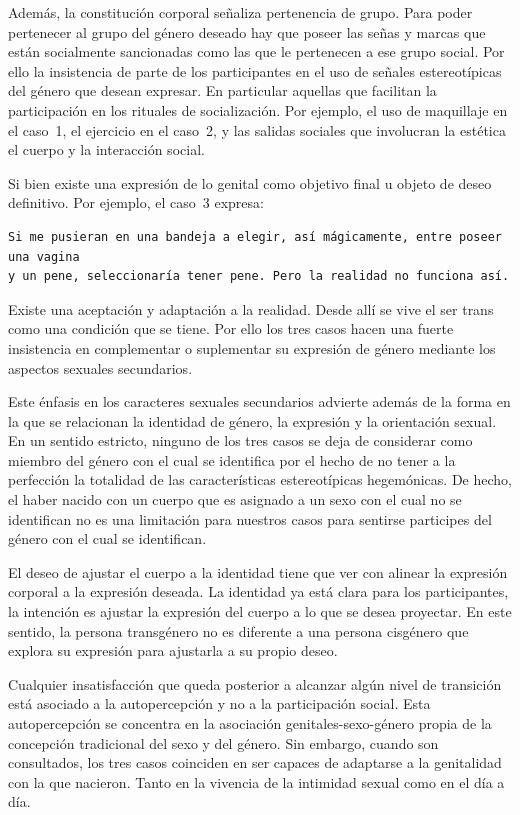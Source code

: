 Además, la constitución corporal señaliza pertenencia de grupo. Para poder
pertenecer al grupo del género deseado hay que poseer las señas y marcas que
están socialmente sancionadas como las que le pertenecen a ese grupo social. Por
ello la insistencia de parte de los participantes en el uso de señales
estereotípicas del género que desean expresar. En particular aquellas que
facilitan la participación en los rituales de socialización. Por ejemplo, el uso
de maquillaje en el caso~1, el ejercicio en el caso~2, y las salidas sociales
que involucran la estética el cuerpo y la interacción social.

Si bien existe una expresión de lo genital como objetivo final u objeto de deseo
definitivo. Por ejemplo, el caso~3 expresa:

\begin{verbatim}
Si me pusieran en una bandeja a elegir, así mágicamente, entre poseer una vagina
y un pene, seleccionaría tener pene. Pero la realidad no funciona así.
\end{verbatim}

Existe una aceptación y adaptación a la realidad. Desde allí se vive el ser
trans como una condición que se tiene. Por ello los tres casos hacen una fuerte
insistencia en complementar o suplementar su expresión de género mediante los
aspectos sexuales secundarios.

Este énfasis en los caracteres sexuales secundarios advierte además de la forma
en la que se relacionan la identidad de género, la expresión y la orientación
sexual. En un sentido estricto, ninguno de los tres casos se deja de considerar
como miembro del género con el cual se identifica por el hecho de no tener a la
perfección la totalidad de las características estereotípicas hegemónicas. De
hecho, el haber nacido con un cuerpo que es asignado a un sexo con el cual no se
identifican no es una limitación para nuestros casos para sentirse participes
del género con el cual se identifican.

El deseo de ajustar el cuerpo a la identidad tiene que ver con alinear la
expresión corporal a la expresión deseada. La identidad ya está clara para los
participantes, la intención es ajustar la expresión del cuerpo a lo que se desea
proyectar. En este sentido, la persona transgénero no es diferente a una persona
cisgénero que explora su expresión para ajustarla a su propio deseo.

 Cualquier insatisfacción que queda posterior a alcanzar algún nivel de
 transición está asociado a la autopercepción y no a la participación social.
 Esta autopercepción se concentra en la asociación genitales-sexo-género propia
 de la concepción tradicional del sexo y del género. Sin embargo, cuando son
 consultados, los tres casos coinciden en ser capaces de adaptarse a la
 genitalidad con la que nacieron. Tanto en la vivencia de la intimidad sexual
 como en el día a día.

